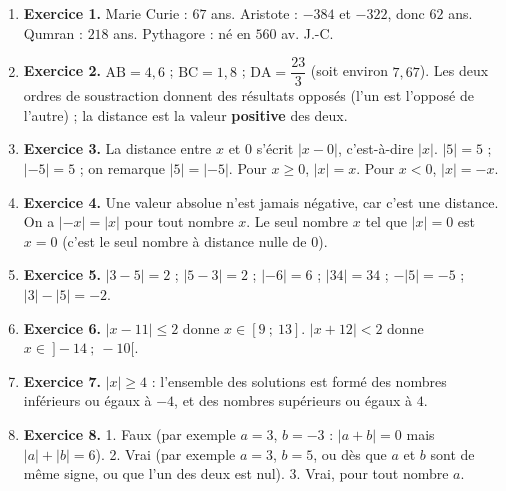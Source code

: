 \documentclass[10pt,a4paper]{article}
\begin{document}
\begin{enumerate}
    \item \textbf{Exercice 1.} Marie Curie : \(67\) ans. Aristote : \(-384\) et \(-322\), donc \(62\) ans. Qumran : \(218\) ans. Pythagore : né en \(560\) av. J.-C.
    \item \textbf{Exercice 2.} \(\text{AB}=4,6\) ; \(\text{BC}=1,8\) ; \(\text{DA}=\dfrac{23}{3}\) (soit environ \(7,67\)). Les deux ordres de soustraction donnent des résultats opposés (l'un est l'opposé de l'autre) ; la distance est la valeur \textbf{positive} des deux.
    \item \textbf{Exercice 3.} La distance entre \(x\) et \(0\) s'écrit \(|x-0|\), c'est-à-dire \(|x|\). \(|5|=5\) ; \(|-5|=5\) ; on remarque \(|5|=|-5|\). Pour \(x\geq 0\), \(|x|=x\). Pour \(x<0\), \(|x|=-x\).
    \item \textbf{Exercice 4.} Une valeur absolue n'est jamais négative, car c'est une distance. On a \(|-x|=|x|\) pour tout nombre \(x\). Le seul nombre \(x\) tel que \(|x|=0\) est \(x=0\) (c'est le seul nombre à distance nulle de \(0\)).
    \item \textbf{Exercice 5.} \(|3-5|=2\) ; \(|5-3|=2\) ; \(|-6|=6\) ; \(|34|=34\) ; \(-|5|=-5\) ; \(|3|-|5|=-2\).
    \item \textbf{Exercice 6.} \(|x-11|\leq 2\) donne \(x\in[9\ ;\ 13]\). \(|x+12|<2\) donne \(x\in\ ]-14\ ;\ -10[\).
    \item \textbf{Exercice 7.} \(|x|\geq 4\) : l'ensemble des solutions est formé des nombres inférieurs ou égaux à \(-4\), et des nombres supérieurs ou égaux à \(4\).
    \item \textbf{Exercice 8.} 1. Faux (par exemple \(a=3\), \(b=-3\) : \(|a+b|=0\) mais \(|a|+|b|=6\)). 2. Vrai (par exemple \(a=3\), \(b=5\), ou dès que \(a\) et \(b\) sont de même signe, ou que l'un des deux est nul). 3. Vrai, pour tout nombre \(a\).
\end{enumerate}
\end{document}
